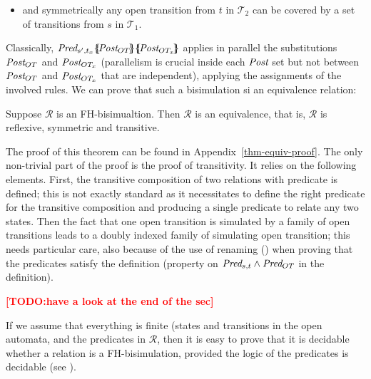 \documentclass{lncs/llncs}
\newcommand{\TODO}[1]{\textcolor{red}{\textbf{[TODO:#1]}}}
\begin{document}
\begin{definition}
\begin{itemize}
     
 \item  and symmetrically any open transition from $t$ in $\mathcal{T}_2$ can be 
      covered by a set of transitions from $s$ in $\mathcal{T}_1$.
 \end{itemize}

 

 \end{definition}
Classically, $\Pred_{s',t_x}\subst{\Post_{OT}}\subst{\Post_{OT_x}}$
applies in parallel the  
substitutions $\Post_{OT}$ and $\Post_{OT_x}$ (parallelism is crucial
inside each $\Post$ set but not between  $\Post_{OT}$ and
$\Post_{OT_x}$ that are independent), applying the assignments of the involved rules.
We can prove that such a bisimulation si an equivalence relation:




\begin{theorem}\label{thm-equiv} Suppose $\mathcal{R}$ 
is an FH-bisimualtion. Then $\mathcal{R}$ is an equivalence, that is, $\mathcal{R}$ is 
reflexive, symmetric and transitive.
\end{theorem}

The proof of this theorem can be found in Appendix~\ref{thm-equiv-proof}. The only non-trivial part of the proof is the proof of transitivity. It relies on the following elements. First,  the transitive composition of two relations with predicate is defined; this is not exactly standard as it necessitates to define the right predicate for the transitive composition and producing a single predicate to relate any two states. Then the fact that one open transition is simulated by a family of open transitions leads to a doubly indexed family of simulating open transition; this needs particular care, also because of the use of renaming (\Post) when proving that the predicates satisfy the definition (property on $\Pred_{s,t} \land \Pred_{OT}$ in the definition). 

\TODO{have a look at the end of the sec}

\medskip

If we assume that everything is finite (states and transitions in the
open automata, and the predicates in $\mathcal{R}$, then it is easy to
prove that it is decidable whether a relation is a 
FH-bisimulation, provided the logic of the predicates is decidable (see \cite{henrio:Forte2016}).
\end{document}
